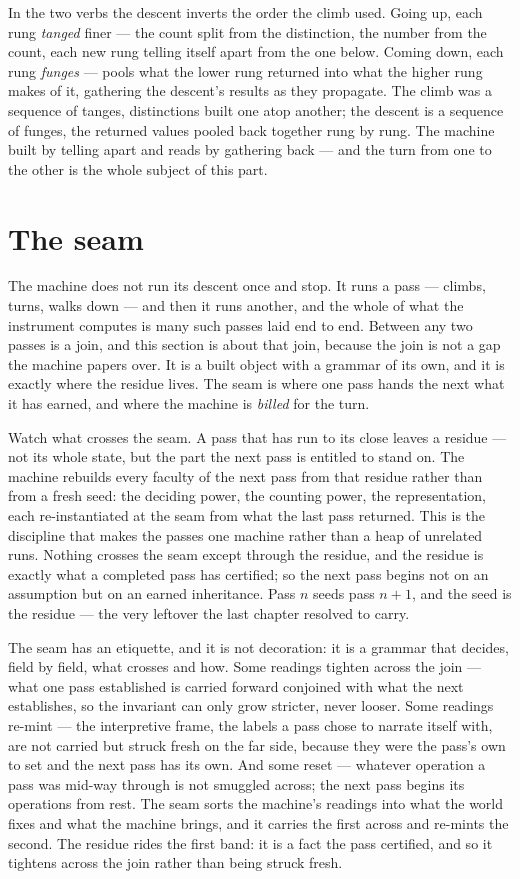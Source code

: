 In the two verbs the descent inverts the order the climb used. Going up, each rung \emph{tanged} finer --- the count
split from the distinction, the number from the count, each new rung telling itself apart from the one below. Coming
down, each rung \emph{funges} --- pools what the lower rung returned into what the higher rung makes of it, gathering the
descent's results as they propagate. The climb was a sequence of tanges, distinctions built one atop another; the
descent is a sequence of funges, the returned values pooled back together rung by rung. The machine built by telling
apart and reads by gathering back --- and the turn from one to the other is the whole subject of this part.

\section{The seam}

The machine does not run its descent once and stop. It runs a pass --- climbs, turns, walks down --- and then it runs
another, and the whole of what the instrument computes is many such passes laid end to end. Between any two passes is a
join, and this section is about that join, because the join is not a gap the machine papers over. It is a built object
with a grammar of its own, and it is exactly where the residue lives. The seam is where one pass hands the next what it
has earned, and where the machine is \emph{billed} for the turn.

Watch what crosses the seam. A pass that has run to its close leaves a residue --- not its whole state, but the part the
next pass is entitled to stand on. The machine rebuilds every faculty of the next pass from that residue rather than
from a fresh seed: the deciding power, the counting power, the representation, each re-instantiated at the seam from what
the last pass returned. This is the discipline that makes the passes one machine rather than a heap of unrelated runs.
Nothing crosses the seam except through the residue, and the residue is exactly what a completed pass has certified; so
the next pass begins not on an assumption but on an earned inheritance. Pass $n$ seeds pass $n+1$, and the seed is the
residue --- the very leftover the last chapter resolved to carry.

The seam has an etiquette, and it is not decoration: it is a grammar that decides, field by field, what crosses and how.
Some readings tighten across the join --- what one pass established is carried forward conjoined with what the next
establishes, so the invariant can only grow stricter, never looser. Some readings re-mint --- the interpretive frame,
the labels a pass chose to narrate itself with, are not carried but struck fresh on the far side, because they were the
pass's own to set and the next pass has its own. And some reset --- whatever operation a pass was mid-way through is not
smuggled across; the next pass begins its operations from rest. The seam sorts the machine's readings into what the
world fixes and what the machine brings, and it carries the first across and re-mints the second. The residue rides the
first band: it is a fact the pass certified, and so it tightens across the join rather than being struck fresh.

